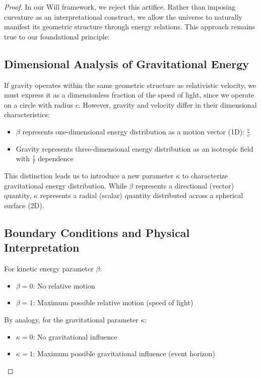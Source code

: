 \documentclass{article}
\begin{document}
\begin{proof}
In our Will framework, we reject this artifice. Rather than imposing curvature as an interpretational construct, we allow the universe to naturally manifest its geometric structure through energy relations. This approach remains true to our foundational principle:

\begin{center}
\end{center}

\subsection{Dimensional Analysis of Gravitational Energy}

If gravity operates within the same geometric structure as relativistic velocity, we must express it as a dimensionless fraction of the speed of light, since we operate on a circle with radius $c$. However, gravity and velocity differ in their dimensional characteristics:

\begin{itemize}
    \item $\beta$ represents one-dimensional energy distribution as a motion vector (1D): $\frac{v}{c}$
    \item Gravity represents three-dimensional energy distribution as an isotropic field with $\frac{1}{r}$ dependence
\end{itemize}

This distinction leads us to introduce a new parameter $\kappa$ to characterize gravitational energy distribution. While $\beta$ represents a directional (vector) quantity, $\kappa$ represents a radial (scalar) quantity distributed across a spherical surface (2D).

\subsection{Boundary Conditions and Physical Interpretation}

For kinetic energy parameter $\beta$:
\begin{itemize}
    \item $\beta = 0$: No relative motion
    \item $\beta = 1$: Maximum possible relative motion (speed of light)
\end{itemize}

By analogy, for the gravitational parameter $\kappa$:
\begin{itemize}
    \item $\kappa = 0$: No gravitational influence
    \item $\kappa = 1$: Maximum possible gravitational influence (event horizon)
\end{itemize}


\end{proof}
\end{document}
